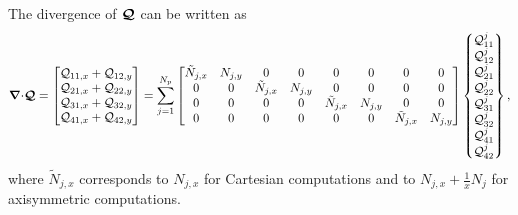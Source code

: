 \documentclass[a4paper,10pt]{article}
\newcommand{\bm}[1]{\text{\boldmath$#1$\unboldmath}}
\newcommand{\Div}{{\bm{\nabla}\cdot}}
\newcommand{\SecOrdTens}[1]{\bm{\mathcal{#1}}}
\newcommand{\G}{\SecOrdTens{Q}}
\begin{document}
The divergence of $\G$ can be written as
\[
 \Div \G = 
 \begin{bmatrix}
  \mathcal{Q}_{11,x} + \mathcal{Q}_{12,y} \\
  \mathcal{Q}_{21,x} + \mathcal{Q}_{22,y} \\
  \mathcal{Q}_{31,x} + \mathcal{Q}_{32,y} \\
  \mathcal{Q}_{41,x} + \mathcal{Q}_{42,y} \\
 \end{bmatrix}=\sum_{j=1}^{N_p}
\begin{bmatrix}
\tilde{N}_{j,x}&    N_{j,y}   &       0       &       0       &       0       &       0      &       0     &       0\\ 
       0       &      0       &\tilde{N}_{j,x}&     N_{j,y}   &       0       &       0      &       0     &       0\\ 
       0       &      0       &       0       &       0       &\tilde{N}_{j,x}&    N_{j,y}   &       0     &       0\\ 
       0       &      0       &       0       &       0       &       0       &       0      &\tilde{N}_{j,x}&    N_{j,y}
\end{bmatrix}  
\begin{Bmatrix}
  \mathcal{Q}_{11}^j\\
  \mathcal{Q}_{12}^j\\
  \mathcal{Q}_{21}^j\\
  \mathcal{Q}_{22}^j\\               
  \mathcal{Q}_{31}^j\\
  \mathcal{Q}_{32}^j\\
  \mathcal{Q}_{41}^j\\
  \mathcal{Q}_{42}^j
\end{Bmatrix},
\]
where $\tilde{N}_{j,x}$ corresponds to $N_{j,x}$ for Cartesian computations and to $N_{j,x}+\frac{1}{x}N_j$ for axisymmetric computations. 
\end{document}
